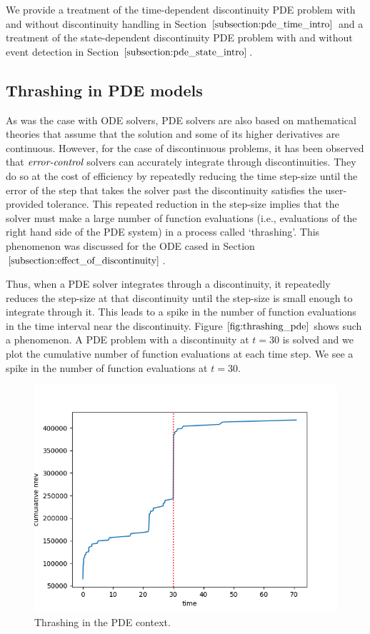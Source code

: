 We provide a treatment of the time-dependent discontinuity PDE problem with and without discontinuity handling in Section $\ref{subsection:pde_time_intro}$ and a treatment of the state-dependent discontinuity PDE problem with and without event detection in Section $\ref{subsection:pde_state_intro}$.

\subsection{Thrashing in PDE models}
\label{subsection:pde_thrashing}
As was the case with ODE solvers, PDE solvers are also based on mathematical theories that assume that the solution and some of its higher derivatives are continuous. However, for the case of discontinuous problems, it has been observed that $\emph{error-control}$ solvers can accurately integrate through discontinuities. They do so at the cost of efficiency by repeatedly reducing the time step-size until the error of the step that takes the solver past the discontinuity satisfies the user-provided tolerance. This repeated reduction in the step-size implies that the solver must make a large number of function evaluations (i.e., evaluations of the right hand side of the PDE system) in a process called `thrashing'. This phenomenon was discussed for the ODE cased in Section $\ref{subsection:effect_of_discontinuity}$.

Thus, when a PDE solver integrates through a discontinuity, it repeatedly reduces the step-size at that discontinuity until the step-size is small enough to integrate through it. This leads to a spike in the number of function evaluations in the time interval near the discontinuity. Figure $\ref{fig:thrashing_pde}$ shows such a phenomenon. A PDE problem with a discontinuity at $t=30$ is solved and we plot the cumulative number of function evaluations at each time step. We see a spike in the number of function evaluations at $t=30$.
\begin{figure}[H]
\centering
\includegraphics[width=0.7\linewidth]{./figures/pde_thrashing}
\caption{Thrashing in the PDE context.}
\label{fig:thrashing_pde}
\end{figure}

